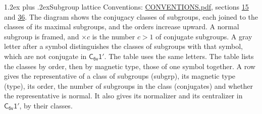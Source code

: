\documentclass[10pt,a4paper]{article}
\makeatletter
\renewcommand\section{\@startsection{section}{1}{\z@}{-3ex plus -1ex minus -.2ex}%
  {1.2ex plus .2ex}{\normalfont\large\sffamily\bfseries\color{parttitle}}}
\numberwithin{equation}{section}
\newcommand{\grp}[1]{\mathsf{#1}}
\makeatother
\begin{document}
\section{Subgroup lattice}\label{s:subgroups}
Conventions: \href{../../CONVENTIONS.pdf}{CONVENTIONS.pdf}, sections \href{../../../rotation/CONVENTIONS.pdf\#conv.15}{15} and \href{../../CONVENTIONS.pdf\#conv.36}{36}.
The diagram shows the conjugacy classes of subgroups, each joined to the classes of its maximal subgroups, and the orders increase upward. \label{n:index.conjugates.c}\label{n:mark.conjugates}A normal subgroup is framed, and ${\times}c$ is the number $c > 1$ of conjugate subgroups. \label{n:mark.letter}A gray letter after a symbol distinguishes the classes of subgroups with that symbol, which are not conjugate in $\grp{C_{6v}1'}$. The table uses the same letters. The table lists the classes by order, then by magnetic type, those of one symbol together. \label{n:head.subgroup}\label{n:head.magnetic.type}\label{n:head.order}\label{n:head.conjugates}\label{n:head.normal}A row gives the representative of a class of subgroups (subgrp), its magnetic type (type), its order, the number of subgroups in the class (conjugates) and whether the representative is normal. \label{n:head.normalizer}\label{n:head.centralizer}It also gives its normalizer and its centralizer in $\grp{C_{6v}1'}$, by their classes. 
\end{document}
